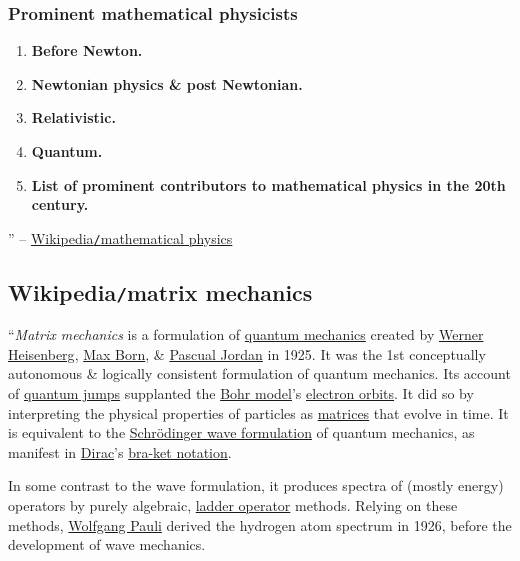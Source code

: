\documentclass{article}
\begin{document}
\subsubsection{Prominent mathematical physicists}

\begin{enumerate}
	\item {\bf Before Newton.}
	\item {\bf Newtonian physics \& post Newtonian.}
	\item {\bf Relativistic.}
	\item {\bf Quantum.}
	\item {\bf List of prominent contributors to mathematical physics in the 20th century.}
\end{enumerate}
'' -- \href{https://en.wikipedia.org/wiki/Mathematical_physics}{Wikipedia{\tt/}mathematical physics}


\subsection{Wikipedia{\tt/}matrix mechanics}
``{\it Matrix mechanics} is a formulation of \href{https://en.wikipedia.org/wiki/Quantum_mechanics}{quantum mechanics} created by \href{https://en.wikipedia.org/wiki/Werner_Heisenberg}{\sc Werner Heisenberg}, \href{https://en.wikipedia.org/wiki/Max_Born}{\sc Max Born}, \& \href{https://en.wikipedia.org/wiki/Pascual_Jordan}{\sc Pascual Jordan} in 1925. It was the 1st conceptually autonomous \& logically consistent formulation of quantum mechanics. Its account of \href{https://en.wikipedia.org/wiki/Atomic_electron_transition}{quantum jumps} supplanted the \href{https://en.wikipedia.org/wiki/Bohr_model}{Bohr model}'s \href{https://en.wikipedia.org/wiki/Atomic_orbital}{electron orbits}. It did so by interpreting the physical properties of particles as \href{https://en.wikipedia.org/wiki/Matrix_(mathematics)}{matrices} that evolve in time. It is equivalent to the \href{https://en.wikipedia.org/wiki/Schr%C3%B6dinger_equation}{Schrödinger wave formulation} of quantum mechanics, as manifest in \href{https://en.wikipedia.org/wiki/Paul_Dirac}{\sc Dirac}'s \href{https://en.wikipedia.org/wiki/Bra%E2%80%93ket_notation}{bra-ket notation}.

In some contrast to the wave formulation, it produces spectra of (mostly energy) operators by purely algebraic, \href{https://en.wikipedia.org/wiki/Ladder_operator}{ladder operator} methods. Relying on these methods, \href{https://en.wikipedia.org/wiki/Wolfgang_Pauli}{\sc Wolfgang Pauli} derived the hydrogen atom spectrum in 1926, before the development of wave mechanics.
\end{document}
